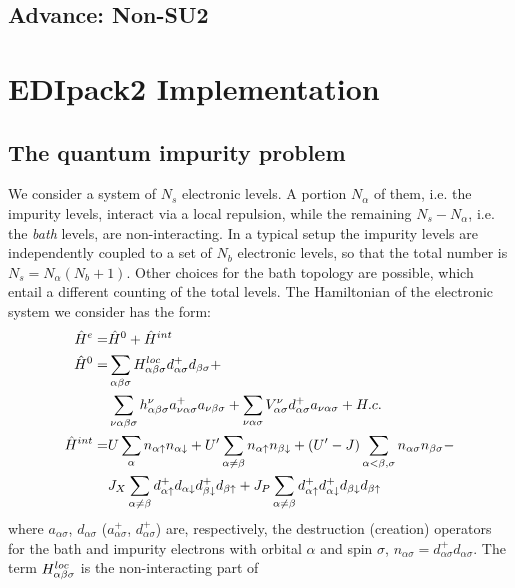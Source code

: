 \documentclass[final,3p,10pt]{elsarticle}
\def\a{\alpha}       \def\b{\beta}   \def\g{\gamma}   \def\d{\delta}
\begin{document}
\subsection{Advance: Non-SU2}


\section{EDIpack2 Implementation}\label{SecEDIpack}

\subsection{The quantum impurity problem}\label{sSecQIM}
We consider a system of $N_s$ electronic levels.  A portion $N_\alpha$  of them,
i.e. the impurity levels, interact via a local repulsion, while the
remaining $N_s-N_\alpha$, i.e. the  \textit{bath} levels, are  non-interacting.
In a typical setup the impurity levels are independently coupled to a
set of $N_b$ electronic levels, so that the total number is $N_{s}=N_\alpha 
(N_{b}+1)$. Other choices for the bath topology are possible, which entail a different counting of the total levels.
The Hamiltonian of the electronic system we consider has the form:
\begin{equation}\label{Ham1}
  \begin{split}
    \hat{H}^{e}=&\hat{H}^0+\hat{H}^{int} \\
    \hat{H}^0 = &
    \sum_{\a\b\sigma}
    H^{loc}_{\a\b\sigma}d^{+}_{\a\sigma}d_{\b\sigma}  + \cr
    &\sum_{\nu\a\b\sigma}h^\nu_{\a\b\sigma}a^{+}_{\nu\a\sigma}a_{\nu\b\sigma}+ 
    \sum_{\nu\a\sigma}V^\nu_{\a\sigma}d^{+}_{\a\sigma}a_{\nu\a\sigma}+
    H.c. \\
    \hat{H}^{int}=& U\sum_{\a}n_{\a\uparrow}n_{\a\downarrow}+U'\sum_{\a\neq \b}n_{\a\uparrow}n_{\b\downarrow}+(U'-J)\sum_{\a<\b,\sigma}n_{\a\sigma}n_{\b\sigma}-\\
    &J_X\sum_{\a\neq \b}d^{+}_{\a\uparrow}d_{\a\downarrow}d^{+}_{\b\downarrow}d_{\b\uparrow}+J_P\sum_{\a \neq \b}d^{+}_{\a\uparrow}d^{+}_{\a\downarrow}d_{\b\downarrow}d_{\b\uparrow}
\end{split}
\end{equation}
where $a_{\alpha\sigma}$, $d_{\a\sigma}$ ($a^+_{\alpha\sigma}$,
$d^+_{\a\sigma}$) are, respectively, the destruction (creation) operators for
the bath and impurity electrons with
orbital $\alpha$ and spin $\sigma$,
$n_{\alpha\sigma}=d^{+}_{\alpha\sigma}d_{\alpha\sigma}$. 
The term $H_{\a\b\s}^{loc}$ is the non-interacting part of
\end{document}
